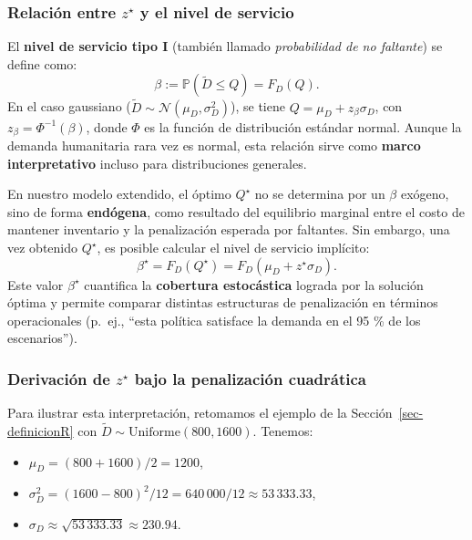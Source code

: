 \documentclass[
  spanish,
  us-letterpaper,
]{scrreprt}
\providecommand{\tightlist}{%
  \setlength{\itemsep}{0pt}\setlength{\parskip}{0pt}}
\numberwithin{equation}{section}
\begin{document}
\subsubsection{\texorpdfstring{Relación entre \(z^\star\) y el nivel de
servicio}{Relación entre z\^{}\textbackslash star y el nivel de servicio}}\label{relaciuxf3n-entre-zstar-y-el-nivel-de-servicio}

El \textbf{nivel de servicio tipo I} (también llamado \emph{probabilidad
de no faltante}) se define como: \[
\beta := \mathbb{P}(\tilde{D} \leq Q) = F_D(Q).
\] En el caso gaussiano
(\(\tilde{D} \sim \mathcal{N}(\mu_D, \sigma_D^2)\)), se tiene
\(Q = \mu_D + z_\beta \sigma_D\), con \(z_\beta = \Phi^{-1}(\beta)\),
donde \(\Phi\) es la función de distribución estándar normal. Aunque la
demanda humanitaria rara vez es normal, esta relación sirve como
\textbf{marco interpretativo} incluso para distribuciones generales.

En nuestro modelo extendido, el óptimo \(Q^\star\) no se determina por
un \(\beta\) exógeno, sino de forma \textbf{endógena}, como resultado
del equilibrio marginal entre el costo de mantener inventario y la
penalización esperada por faltantes. Sin embargo, una vez obtenido
\(Q^\star\), es posible calcular el nivel de servicio implícito: \[
\beta^\star = F_D(Q^\star) = F_D(\mu_D + z^\star \sigma_D).
\] Este valor \(\beta^\star\) cuantifica la \textbf{cobertura
estocástica} lograda por la solución óptima y permite comparar distintas
estructuras de penalización en términos operacionales (p.~ej., ``esta
política satisface la demanda en el 95 \% de los escenarios'').

\subsubsection{\texorpdfstring{Derivación de \(z^\star\) bajo la
penalización
cuadrática}{Derivación de z\^{}\textbackslash star bajo la penalización cuadrática}}\label{derivaciuxf3n-de-zstar-bajo-la-penalizaciuxf3n-cuadruxe1tica}

Para ilustrar esta interpretación, retomamos el ejemplo de la
Sección~\ref{sec-definicionR} con
\(\tilde{D} \sim \text{Uniforme}(800, 1600)\). Tenemos:

\begin{itemize}
\tightlist
\item
  \(\mu_D = (800 + 1600)/2 = 1200\),
\item
  \(\sigma_D^2 = (1600 - 800)^2 / 12 = 640\,000 / 12 \approx 53\,333.33\),
\item
  \(\sigma_D \approx \sqrt{53\,333.33} \approx 230.94\).
\end{itemize}
\end{document}
